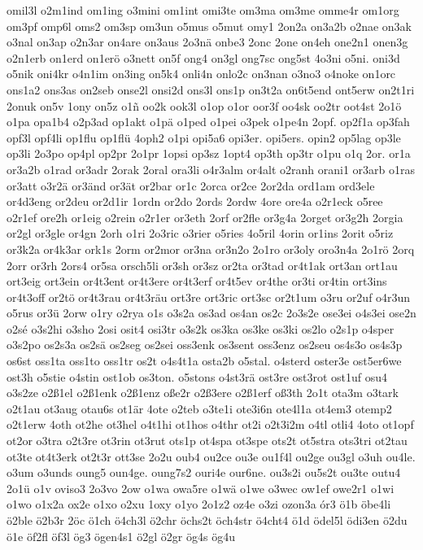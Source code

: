 {omil3l
o2m1ind
om1ing
o3mini
om1int
omi3te
om3ma
om3me
omme4r
om1org
om3pf
omp6l
oms2
om3sp
om3un
o5mus
o5mut
omy1
2on2a
on3a2b
o2nae
on3ak
o3nal
on3ap
o2n3ar
on4are
on3aus
2o3nä
onbe3
2onc
2one
on4eh
one2n1
onen3g
o2n1erb
on1erd
on1erö
o3nett
on5f
ong4
on3gl
ong7sc
ong5st
4o3ni
o5ni.
oni3d
o5nik
oni4kr
o4n1im
on3ing
on5k4
onli4n
onlo2c
on3nan
o3no3
o4noke
on1orc
ons1a2
ons3as
on2seb
onse2l
onsi2d
ons3l
ons1p
on3t2a
on6t5end
ont5erw
on2t1ri
2onuk
on5v
1ony
on5z
o1ñ
oo2k
ook3l
o1op
o1or
oor3f
oo4sk
oo2tr
oot4st
2o1ö
o1pa
opa1b4
o2p3ad
op1akt
o1pä
o1ped
o1pei
o3pek
o1pe4n
2opf.
op2f1a
op3fah
opf3l
opf4li
op1flu
op1flü
4oph2
o1pi
opi5a6
opi3er.
opi5ers.
opin2
op5lag
op3le
op3li
2o3po
op4pl
op2pr
2o1pr
1opsi
op3sz
1opt4
op3th
op3tr
o1pu
o1q
2or.
or1a
or3a2b
o1rad
or3adr
2orak
2oral
ora3li
o4r3alm
or4alt
o2ranh
orani1
or3arb
o1ras
or3att
o3r2ä
or3änd
or3ät
or2bar
or1c
2orca
or2ce
2or2da
ord1am
ord3ele
or4d3eng
or2deu
or2d1ir
1ordn
or2do
2ords
2ordw
4ore
ore4a
o2r1eck
o5ree
o2r1ef
ore2h
or1eig
o2rein
o2r1er
or3eth
2orf
or2fle
or3g4a
2orget
or3g2h
2orgia
or2gl
or3gle
or4gn
2orh
o1ri
2o3ric
o3rier
o5ries
4o5ril
4orin
or1ins
2orit
o5riz
or3k2a
or4k3ar
ork1s
2orm
or2mor
or3na
or3n2o
2o1ro
or3oly
oro3n4a
2o1rö
2orq
2orr
or3rh
2ors4
or5sa
orsch5li
or3sh
or3sz
or2ta
or3tad
or4t1ak
ort3an
ort1au
ort3eig
ort3ein
or4t3ent
or4t3ere
or4t3erf
or4t5ev
or4the
or3ti
or4tin
ort3ins
or4t3off
or2tö
or4t3rau
or4t3räu
ort3re
ort3ric
ort3sc
or2t1um
o3ru
or2uf
o4r3un
o5rus
or3ü
2orw
o1ry
o2rya
o1s
o3s2a
os3ad
os4an
os2c
2o3s2e
ose3ei
o4s3ei
ose2n
o2sé
o3s2hi
o3sho
2osi
osit4
osi3tr
o3s2k
os3ka
os3ke
os3ki
os2lo
o2s1p
o4sper
o3s2po
os2s3a
os2sä
os2seg
os2sei
oss3enk
os3sent
oss3enz
os2seu
os4s3o
os4s3p
os6st
oss1ta
oss1to
oss1tr
os2t
o4s4t1a
osta2b
o5stal.
o4sterd
oster3e
ost5er6we
ost3h
o5stie
o4stin
ost1ob
os3ton.
o5stons
o4st3rä
ost3re
ost3rot
ost1uf
osu4
o3s2ze
o2ß1el
o2ß1enk
o2ß1enz
oße2r
o2ß3ere
o2ß1erf
oß3th
2o1t
ota3m
o3tark
o2t1au
ot3aug
otau6s
ot1är
4ote
o2teb
o3te1i
ote3i6n
ote4l1a
ot4em3
otemp2
o2t1erw
4oth
ot2he
ot3hel
o4t1hi
ot1hos
o4thr
ot2i
o2t3i2m
o4tl
otli4
4oto
ot1opf
ot2or
o3tra
o2t3re
ot3rin
ot3rut
ots1p
ot4spa
ot3spe
ots2t
ot5stra
ots3tri
ot2tau
ot3te
ot4t3erk
ot2t3r
ott3se
2o2u
oub4
ou2ce
ou3e
ou1f4l
ou2ge
ou3gl
o3uh
ou4le.
o3um
o3unds
oung5
oun4ge.
oung7s2
ouri4e
our6ne.
ou3s2i
ou5s2t
ou3te
outu4
2o1ü
o1v
oviso3
2o3vo
2ow
o1wa
owa5re
o1wä
o1we
o3wec
ow1ef
owe2r1
o1wi
o1wo
o1x2a
ox2e
o1xo
o2xu
1oxy
o1yo
2o1z2
oz4e
o3zi
ozon3a
ór3
ö1b
öbe4li
ö2ble
ö2b3r
2öc
ö1ch
ö4ch3l
ö2chr
öchs2t
öch4str
ö4cht4
ö1d
ödel5l
ödi3en
ö2du
ö1e
öf2fl
öf3l
ög3
ögen4s1
ö2gl
ö2gr
ög4s
ög4u
}
